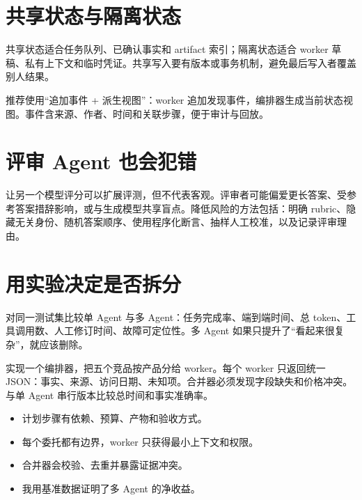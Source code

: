 \section{共享状态与隔离状态}

共享状态适合任务队列、已确认事实和 artifact 索引；隔离状态适合 worker 草稿、私有上下文和临时凭证。共享写入要有版本或事务机制，避免最后写入者覆盖别人结果。

推荐使用“追加事件 + 派生视图”：worker 追加发现事件，编排器生成当前状态视图。事件含来源、作者、时间和关联步骤，便于审计与回放。

\section{评审 Agent 也会犯错}

让另一个模型评分可以扩展评测，但不代表客观。评审者可能偏爱更长答案、受参考答案措辞影响，或与生成模型共享盲点。降低风险的方法包括：明确 rubric、隐藏无关身份、随机答案顺序、使用程序化断言、抽样人工校准，以及记录评审理由。

\section{用实验决定是否拆分}

对同一测试集比较单 Agent 与多 Agent：任务完成率、端到端时间、总 token、工具调用数、人工修订时间、故障可定位性。多 Agent 如果只提升了“看起来很复杂”，就应该删除。

\begin{practice}[并行竞品研究]
实现一个编排器，把五个竞品按产品分给 worker。每个 worker 只返回统一 JSON：事实、来源、访问日期、未知项。合并器必须发现字段缺失和价格冲突。与单 Agent 串行版本比较总时间和事实准确率。
\end{practice}

\begin{checkpoint}
\begin{itemize}
  \item \checkbox 计划步骤有依赖、预算、产物和验收方式。
  \item \checkbox 每个委托都有边界，worker 只获得最小上下文和权限。
  \item \checkbox 合并器会校验、去重并暴露证据冲突。
  \item \checkbox 我用基准数据证明了多 Agent 的净收益。
\end{itemize}
\end{checkpoint}

